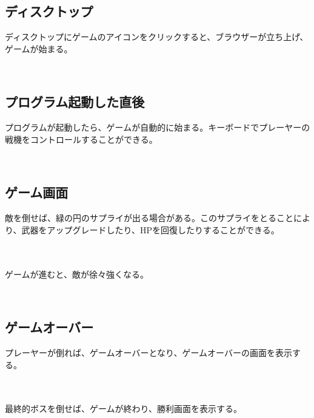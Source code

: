 \subsection{ディスクトップ}
	ディスクトップにゲームのアイコンをクリックすると、ブラウザーが立ち上げ、ゲームが始まる。
	
	\\
\subsection{プログラム起動した直後}
	プログラムが起動したら、ゲームが自動的に始まる。キーボードでプレーヤーの戦機をコントロールすることができる。
	
	\\
\subsection{ゲーム画面}
	敵を倒せば、緑の円のサプライが出る場合がある。このサプライをとることにより、武器をアップグレードしたり、HPを回復したりすることができる。
	
	\\ \\
	ゲームが進むと、敵が徐々強くなる。
	
	\\
\subsection{ゲームオーバー}
	プレーヤーが倒れば、ゲームオーバーとなり、ゲームオーバーの画面を表示する。
	
	\\ \\
	
	最終的ボスを倒せば、ゲームが終わり、勝利画面を表示する。
	
